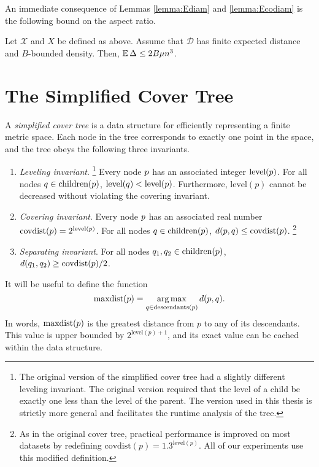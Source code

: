 \documentclass[../main.tex]{subfiles}
\newcommand{\set}[1]{\mathcal {#1}}
\newcommand{\distribution}[1]{\mathcal {#1}}
\newcommand{\dist}[2]{\distf({#1},{#2})}
\newcommand{\distf}{d}
\newcommand{\aspect}[1]{\Delta}
\newcommand{\p}{\ensuremath p}
\newcommand{\q}{\ensuremath q}
\newcommand{\mkfunction}[1]{\ensuremath{\text{{#1}}}}
\newcommand{\level}[1]      {\mkfunction{level}({#1})}
\newcommand{\children}[1]   {\mkfunction{children}({#1})}
\newcommand{\covdist}[1]    {\mkfunction{covdist}({#1})}
\newcommand{\descendants}[1]{\mkfunction{descendants}({#1})}
\newcommand{\maxdist}[1]    {\mkfunction{maxdist}({#1})}
\begin{document}

An immediate consequence of Lemmas \ref{lemma:Ediam} and \ref{lemma:Ecodiam} is the following bound on the aspect ratio.

\begin{lemma}
    \label{lemma:Easpect}
    Let $\set X$ and $X$ be defined as above.
    Assume that $\distribution D$ has finite expected distance and $B$-bounded density.
    Then, $\E\aspect{X} \le2B\mu n^3$. 
\end{lemma}


\section{The Simplified Cover Tree}

A \emph{simplified cover tree} is a data structure for efficiently representing a finite metric space.
Each node in the tree corresponds to exactly one point in the space,
and the tree obeys the following three invariants.
\begin{enumerate}
    \item \emph{Leveling invariant}.%
    \footnote{
        The original version of the simplified cover tree \citep{izbicki2015faster} had a slightly different leveling invariant.
        The original version required that the level of a child be exactly one less than the level of the parent.
        The version used in this thesis is strictly more general and facilitates the runtime analysis of the tree.
    }
    Every node $\p$ has an associated integer $\level\p$.
    For all nodes $\q\in\children\p$, $\level\q < \level\p$.
    Furthermore, $\level p$ cannot be decreased without violating the covering invariant.
    \item \emph{Covering invariant}.
    Every node $\p$ has an associated real number $\covdist\p=2^{\level\p}$.
    For all nodes $\q\in\children\p$, $\dist \p \q \le \covdist\p$.%
    \footnote{
        As in the original cover tree, practical performance is improved on most datasets by redefining $\covdist p = 1.3 ^ {\level p}$.
        All of our experiments use this modified definition.
    }
    \item \emph{Separating invariant}.
    For all nodes $\q_1,\q_2\in\children\p$, $\dist {\q_1} {\q_2} \ge \covdist\p/2$.
\end{enumerate}
It will be useful to define the function
\begin{equation}
\maxdist p = \argmax_{q\in\descendants{p}} \dist p q
.
\end{equation}
In words, $\maxdist\p$ is the greatest distance from $p$ to any of its descendants.
This value is upper bounded by $2^{\level{p}+1}$, 
and its exact value can be cached within the data structure.
\end{document}
